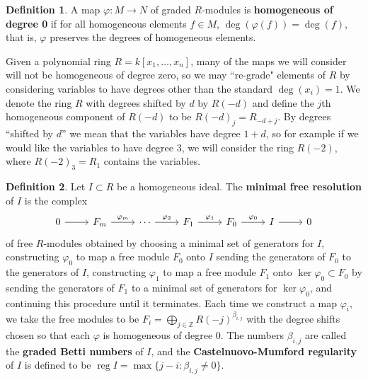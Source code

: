 \documentclass[11pt]{article}
\newcommand{\Z}{\mathbb{Z}}
\DeclareMathOperator{\reg}{reg}
\theoremstyle{definition}
\newtheorem{definition}{Definition}
\begin{document}
\begin{definition}
	A map $\varphi: M \to N$ of graded $R$-modules is \textbf{homogeneous of degree 0} if for all homogeneous elements $f \in M$, $\deg(\varphi(f)) = \deg(f)$, that is, $\varphi$ preserves the degrees of homogeneous elements. 
\end{definition}


Given a polynomial ring $R = k[x_1, \dots, x_n]$, many of the maps we will consider will not be homogeneous of degree zero, so we may ``re-grade" elements of $R$ by considering variables to have degrees other than the standard $\deg(x_i) = 1$. We denote the ring $R$ with degrees shifted by $d$ by $R(-d)$ and define the $j$th homogeneous component of $R(-d)$ to be $R(-d)_j = R_{-d + j}$. By degrees ``shifted by $d$'' we mean that the variables have degree $1 + d$, so for example if we would like the variables to have degree $3$, we will consider the ring $R(-2)$, where $R(-2)_3 = R_1$ contains the variables. 


\begin{definition}
	Let $I \subset R$ be a homogeneous ideal. The \textbf{minimal free resolution} of $I$ is the complex  \[ \begin{tikzcd}
		0 \arrow[r] & F_m \arrow[r, "\varphi_m"] & \cdots \arrow[r, "\varphi_2"] & F_1 \arrow[r, "\varphi_1"] & F_0 \arrow[r, "\varphi_0"] & I \arrow[r] & 0
	\end{tikzcd} \] of free $R$-modules obtained by choosing a minimal set of generators for $I$, constructing $\varphi_0$ to map a free module $F_0$ onto $I$ sending the generators of $F_0$ to the generators of $I$, constructing $\varphi_1$ to map a free module $F_1$ onto $\ker \varphi_0 \subset F_0$ by sending the generators of $F_1$ to a minimal set of generators for $\ker \varphi_0$, and continuing this procedure until it terminates. Each time we construct a map $\varphi_i$, we take the free modules to be $F_i = \bigoplus_{j \in \Z} R(-j)^{\beta_{i,j}}$ with the degree shifts chosen so that each $\varphi$ is homogeneous of degree 0. The numbers $\beta_{i,j}$ are called the \textbf{graded Betti numbers} of $I$, and the \textbf{Castelnuovo-Mumford regularity} of $I$ is defined to be $\reg I = \max\{j - i : \beta_{i,j} \neq 0\}$. 
\end{definition}
\end{document}
